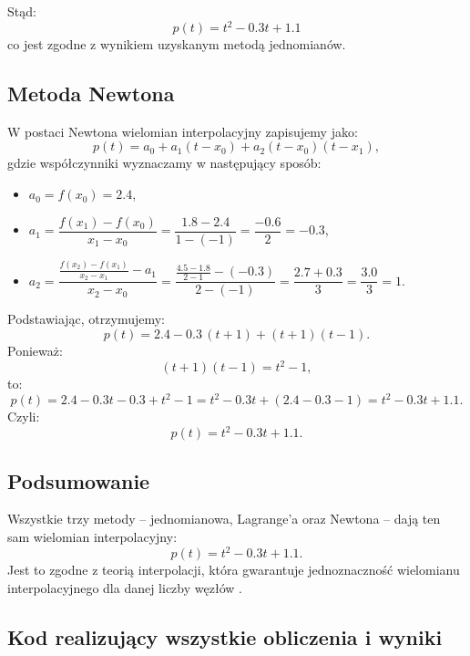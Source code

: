 \documentclass{article}
\begin{document}
Stąd:
\begin{equation}    
p(t)=t^2-0.3t+1.1 \tag{7}
\end{equation}
co jest zgodne z wynikiem uzyskanym metodą jednomianów.\\[2mm]

\subsection{Metoda Newtona}
W postaci Newtona wielomian interpolacyjny zapisujemy jako:
\[
p(t)=a_0+a_1(t-x_0)+a_2(t-x_0)(t-x_1),
\]
gdzie współczynniki wyznaczamy w następujący sposób:
\begin{itemize}
    \item $a_0=f(x_0)=2.4$,
    \item $a_1=\dfrac{f(x_1)-f(x_0)}{x_1-x_0}=\dfrac{1.8-2.4}{1-(-1)}=\dfrac{-0.6}{2}=-0.3$,
    \item $a_2=\dfrac{\displaystyle \frac{f(x_2)-f(x_1)}{x_2-x_1}-a_1}{x_2-x_0}=\dfrac{\displaystyle \frac{4.5-1.8}{2-1} - (-0.3)}{2-(-1)}=\dfrac{2.7+0.3}{3}=\dfrac{3.0}{3}=1.$
\end{itemize}

Podstawiając, otrzymujemy:
\[
p(t)=2.4 - 0.3\,(t+1) + (t+1)(t-1).
\]
Ponieważ:
\[
(t+1)(t-1)=t^2-1,
\]
to:
\[
p(t)=2.4-0.3t-0.3 + t^2-1=t^2-0.3t+(2.4-0.3-1)=t^2-0.3t+1.1.
\]
Czyli:
\begin{equation}
p(t)=t^2-0.3t+1.1. \tag{8}
\end{equation}
\subsection{Podsumowanie}
Wszystkie trzy metody – jednomianowa, Lagrange’a oraz Newtona – dają ten sam wielomian interpolacyjny:
\[
p(t)=t^2-0.3t+1.1.
\]
Jest to zgodne z teorią interpolacji, która gwarantuje jednoznaczność wielomianu interpolacyjnego dla danej liczby węzłów \cite{wiki:Interpolacja_wielomianowa}.

\subsection{Kod realizujący wszystkie obliczenia i wyniki}
\end{document}
